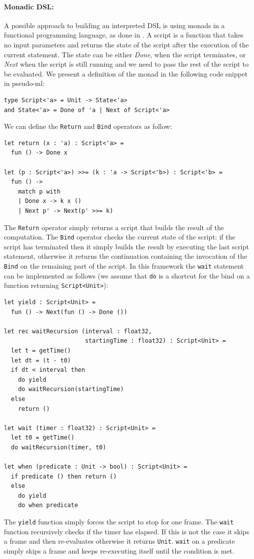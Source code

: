 \paragraph{Monadic DSL:} A possible approach to building an interpreted DSL is using monads in a functional programming language, as done in \cite{CASANOVA1_PAPER}. A script is a function that takes no input parameters and returns the state of the script after the execution of the current statement. The state can be either \textit{Done}, when the script terminates, or \textit{Next} when the script is still running and we need to pass the rest of the script to be evaluated. We present a definition of the monad in the following code snippet in pseudo-ml:

\begin{lstlisting}
type Script<'a> = Unit -> State<'a>
and State<'a> = Done of 'a | Next of Script<'a>
\end{lstlisting}

\noindent
We can define the \texttt{Return} and \texttt{Bind} operators as follow:

\begin{lstlisting}
let return (x : 'a) : Script<'a> =
  fun () -> Done x
  
let (p : Script<'a>) >>= (k : 'a -> Script<'b>) : Script<'b> =
  fun () ->
    match p with
    | Done x -> k x ()
    | Next p' -> Next(p' >>= k)
\end{lstlisting}

\noindent
The \texttt{Return} operator simply returns a script that builds the result of the computation. The \texttt{Bind} operator checks the current state of the script: if the script has terminated then it simply builds the result by executing the last script statement, otherwise it returns the continuation containing the invocation of the \texttt{Bind} on the remaining part of the script. In this framework the \texttt{wait} statement can be implemented as follows (we assume that \texttt{do} is a shortcut for the bind on a function returning \texttt{Script<Unit>}):

\begin{lstlisting}
let yield : Script<Unit> =
  fun () -> Next(fun () -> Done ())

let rec waitRecursion (interval : float32, 
                       startingTime : float32) : Script<Unit> =
  let t = getTime()
  let dt = (t - t0)
  if dt < interval then
    do yield
    do waitRecursion(startingTime)
  else
    return ()
      
let wait (timer : float32) : Script<Unit> =
  let t0 = getTime()
  do waitRecursion(timer, t0)
  
let when (predicate : Unit -> bool) : Script<Unit> =
  if predicate () then return ()
  else
    do yield
    do when predicate
\end{lstlisting}
\noindent
The \texttt{yield} function simply forces the script to stop for one frame. The \texttt{wait} function recursively checks if the timer has elapsed. If this is not the case it skips a frame and then re-evaluates otherwise it returns \texttt{Unit}. \texttt{wait} on a predicate simply skips a frame and keeps re-executing itself until the condition is met.

